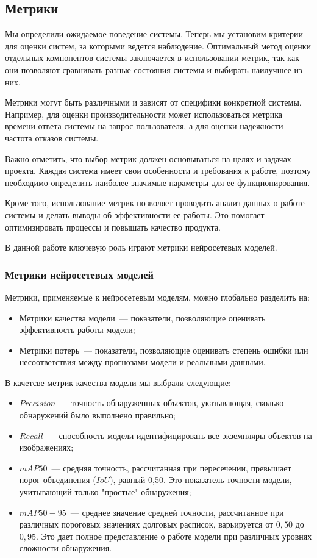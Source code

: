 \subsection{Метрики}
Мы определили ожидаемое поведение системы. Теперь мы установим критерии для оценки систем, за которыми ведется наблюдение. Оптимальный метод оценки отдельных компонентов системы заключается в использовании метрик, так как они позволяют сравнивать разные состояния системы и выбирать наилучшее из них.

Метрики могут быть различными и зависят от специфики конкретной системы. Например, для оценки производительности может использоваться метрика времени ответа системы на запрос пользователя, а для оценки надежности - частота отказов системы.

Важно отметить, что выбор метрик должен основываться на целях и задачах проекта. Каждая система имеет свои особенности и требования к работе, поэтому необходимо определить наиболее значимые параметры для ее функционирования.

Кроме того, использование метрик позволяет проводить анализ данных о работе системы и делать выводы об эффективности ее работы. Это помогает оптимизировать процессы и повышать качество продукта.

В данной работе ключевую роль играют метрики нейросетевых моделей.

\subsubsection{Метрики нейросетевых моделей}

Метрики, применяемые к нейросетевым моделям, можно глобально разделить на:
\begin{itemize}
    \item Метрики качества модели~--- показатели, позволяющие оценивать эффективность работы модели;
    \item Метрики потерь~--- показатели, позволяющие оценивать степень ошибки или несоответствия между прогнозами модели и реальными данными.
\end{itemize}

В качетсве метрик качества модели мы выбрали следующие:

\begin{itemize}
    \item $Precision$~--- точность обнаруженных объектов, указывающая, сколько обнаружений было выполнено правильно;
    \item $Recall$~--- способность модели идентифицировать все экземпляры объектов на изображениях;
    \item $mAP50$~--- средняя точность, рассчитанная при пересечении, превышает порог объединения ($IoU$), равный 0,50. Это показатель точности модели, учитывающий только "простые" обнаружения;
    \item $mAP50-95$~--- среднее значение средней точности, рассчитанное при различных пороговых значениях долговых расписок, варьируется от $0,50$ до $0,95$. Это дает полное представление о работе модели при различных уровнях сложности обнаружения.
\end{itemize}

